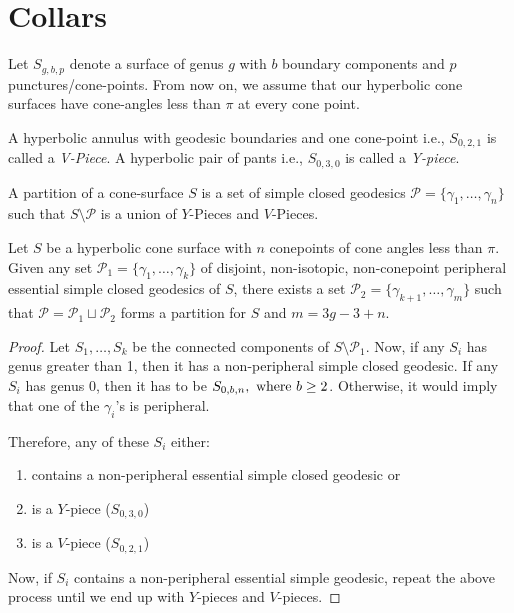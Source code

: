 \section{Collars}\label{collars}

Let $S_{g,b,p}$ denote a surface of genus $g$ with $b$ boundary components and $p$ punctures/cone-points. From now on, we assume that our hyperbolic cone surfaces have cone-angles less than $\pi$ at every cone point.

\begin{defn}
	A hyperbolic annulus with geodesic boundaries and one cone-point i.e., $S_{0,2,1}$ is called a \textit{V-Piece}. A hyperbolic pair of pants i.e., $S_{0,3,0}$ is called a \textit{Y-piece}.
\end{defn}

\begin{defn} \label{partition}
	A partition of a cone-surface $S$ is a set of simple closed geodesics $\mathcal{P} = \{\gamma_1, \ldots, \gamma_n\}$ such that  $ S \setminus \mathcal{P}$ is a union of $Y$-Pieces and $V$-Pieces.
\end{defn}

\begin{lem} \label{partition:existence}
		Let $S$ be a hyperbolic cone surface with $n$ conepoints of cone angles less than $\pi$. Given any set $\mathcal{P}_1 = \{\gamma_1, \ldots, \gamma_k\}$ of disjoint, non-isotopic, non-conepoint peripheral essential simple closed geodesics of $S$, there exists a set $\mathcal{P}_2 = \{\gamma_{k+1}, \ldots, \gamma_m\}$ such that $\mathcal{P} = \mathcal{P}_1 \sqcup \mathcal{P}_2$ forms a partition for $S$ and $m = 3g-3+n$.
\end{lem}

\begin{proof}
	Let $S_1, \ldots, S_k$ be the connected components of $S \setminus \mathcal{P}_1$. Now, if any $S_i$ has genus greater than 1, then it has a non-peripheral simple closed geodesic. If any $S_i$ has genus 0, then it has to be $S_{0,b,n}, \textup{ where } b \geq 2$. Otherwise, it would imply that one of the $\gamma_i$'s is peripheral. 
	
	Therefore, any of these $S_i$ either:
	\begin{enumerate}
		\item contains a non-peripheral essential simple closed geodesic or
		\item is a $Y$-piece ($S_{0,3,0}$) 
		\item is a $V$-piece ($S_{0,2,1}$)
	\end{enumerate}
	
	Now, if $S_i$ contains a non-peripheral essential simple geodesic, repeat the above process until we end up with $Y$-pieces and $V$-pieces.
	
\end{proof}

